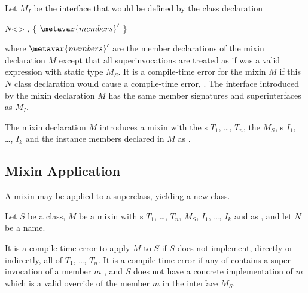 \documentclass[makeidx]{article}
\begin{document}
\LMHash{}
Let $M_I$ be the interface that would be defined by the class declaration

\begin{normativeDartCode}
\ABSTRACT{} \CLASS{} $N$<\TypeParametersStd>
    \IMPLEMENTS{} ,  \{
  $\metavar{members}'$
\}
\end{normativeDartCode}

where $\metavar{members}'$ are the member declarations of
the mixin declaration $M$ except that all superinvocations are treated
as if \SUPER{} was a valid expression with static type $M_S$.
It is a compile-time error for the mixin $M$ if this $N$ class
declaration would cause a compile-time error, .
The interface introduced by the mixin declaration $M$ has the same member
signatures and superinterfaces as $M_I$.

\LMHash{}%
The mixin declaration $M$ introduces a mixin
with the s $T_1$, \ldots{}, $T_n$,
the  $M_S$,
s $I_1$, \ldots{}, $I_k$
and the instance members declared in $M$ as .

\subsection{Mixin Application}

\LMHash{}%
A mixin may be applied to a superclass, yielding a new class.

\LMHash{}%
Let $S$ be a class,
$M$ be a mixin with s $T_1$, \ldots, $T_n$,
 $M_S$,
 $I_1$, \ldots{}, $I_k$ and
 as ,
and let $N$ be a name.

\LMHash{}%
It is a compile-time error to apply $M$ to $S$ if $S$ does not implement,
directly or indirectly, all of $T_1$, \ldots, $T_n$.
It is a compile-time error if any of  contains a
super-invocation of a member $m$ , and $S$ does not have a concrete
implementation of $m$ which is a valid override of the member $m$ in
the interface $M_S$. 
\end{document}
